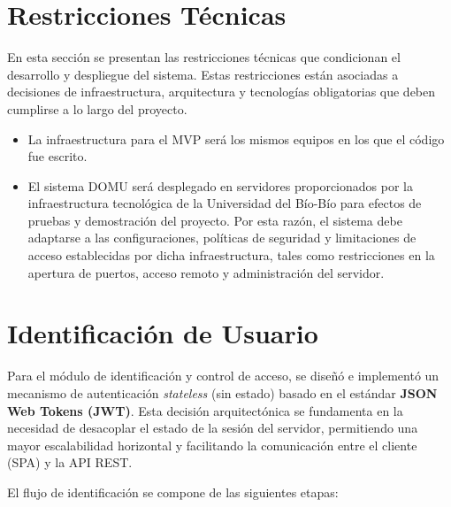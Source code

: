 \section{Restricciones Técnicas}
En esta sección se presentan las restricciones técnicas que condicionan el desarrollo y despliegue del sistema. Estas restricciones están asociadas a decisiones de infraestructura, arquitectura y tecnologías obligatorias que deben cumplirse a lo largo del proyecto.

\begin{itemize}
    \item La infraestructura para el MVP será los mismos equipos en los que el código fue escrito.
    \item El sistema DOMU será desplegado en servidores proporcionados por la infraestructura tecnológica de la Universidad del Bío-Bío para efectos de pruebas y demostración del proyecto.  Por esta razón, el sistema debe adaptarse a las configuraciones, políticas de seguridad y limitaciones de acceso establecidas por dicha infraestructura, tales como restricciones en la apertura de puertos, acceso remoto y administración del servidor.
\end{itemize}

\section{Identificación de Usuario}
Para el módulo de identificación y control de acceso, se diseñó e implementó un mecanismo de autenticación \textit{stateless} (sin estado) basado en el estándar \textbf{JSON Web Tokens (JWT)}. Esta decisión arquitectónica se fundamenta en la necesidad de desacoplar el estado de la sesión del servidor, permitiendo una mayor escalabilidad horizontal y facilitando la comunicación entre el cliente (SPA) y la API REST.

El flujo de identificación se compone de las siguientes etapas:

